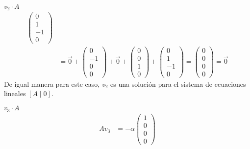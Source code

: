 \documentclass{article}
\begin{document}
\begin{enumerate}
\begin{mathcase}{\(v_2 \cdot A\)}
\[\begin{aligned}
                    \begin{pmatrix}
                        0 \\ 1 \\ -1 \\ 0
                    \end{pmatrix} 
                    \\
                    &=
                    \vec{0}
                    +
                    \begin{pmatrix}
                        0 \\ -1 \\ 0 \\ 0
                    \end{pmatrix}
                    +
                    \vec{0}
                    +
                    \begin{pmatrix}
                        0 \\ 0 \\ 1 \\ 0
                    \end{pmatrix}
                    +
                    \begin{pmatrix}
                        0 \\ 1 \\ -1 \\ 0
                    \end{pmatrix} 
                    = 
                    \begin{pmatrix}
                        0 \\ 0 \\ 0 \\ 0
                    \end{pmatrix}
                    = 
                    \vec{0}
                \end{aligned}
            \]
            De igual manera para este caso, \(v_2\) es una solución 
            para el sistema de ecuaciones lineales \(\left[A \mid 0\right]\).
        \end{mathcase}
        \begin{mathcase}{\(v_3 \cdot A\)}
            \[
                \begin{aligned}
                    Av_3 &= 
                    -\alpha
                    \begin{pmatrix}
                        1 \\ 0 \\ 0 \\ 0

\end{pmatrix}
\end{aligned}\]
\end{mathcase}
\end{enumerate}
\end{document}
